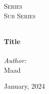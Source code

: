 
\begin{titlepage}
    \vbox{ }
    \vbox{ }
    \begin{center}

        \textsc{\LARGE Series}\\[1.5cm]
        \textsc{\Large Sub Series}\\[0.5cm]
        \vbox{ }

        \HRule \\[0.5cm]
        { \huge \bfseries Title}\\[0.3cm]
        \HRule \\[1.5cm]

        \large
        \emph{Author:}\\
        Maad
        \vfill

        {\large January, 2024}

    \end{center}
\end{titlepage}
